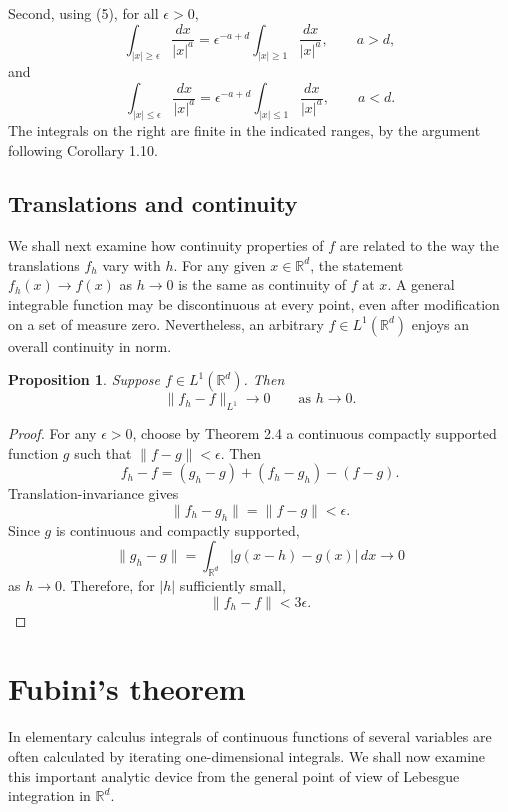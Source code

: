 \documentclass[11pt,openany]{book}
\newtheorem{proposition}[theorem]{Proposition}
\begin{document}
Second, using (5), for all $\epsilon>0$,
\begin{equation}
\int_{|x|\geq\epsilon}\frac{dx}{|x|^a}
=\epsilon^{-a+d}\int_{|x|\geq1}\frac{dx}{|x|^a},
\qquad a>d,
\tag{7}
\end{equation}
and
\begin{equation}
\int_{|x|\leq\epsilon}\frac{dx}{|x|^a}
=\epsilon^{-a+d}\int_{|x|\leq1}\frac{dx}{|x|^a},
\qquad a<d.
\tag{8}
\end{equation}
The integrals on the right are finite in the indicated ranges, by the argument following Corollary 1.10.

\subsection*{Translations and continuity}

We shall next examine how continuity properties of $f$ are related to the way the translations $f_h$ vary with $h$. For any given $x\in\mathbb{R}^d$, the statement $f_h(x)\to f(x)$ as $h\to0$ is the same as continuity of $f$ at $x$. A general integrable function may be discontinuous at every point, even after modification on a set of measure zero. Nevertheless, an arbitrary $f\in L^1(\mathbb{R}^d)$ enjoys an overall continuity in norm.

\begin{proposition}
Suppose $f\in L^1(\mathbb{R}^d)$. Then
\[
\|f_h-f\|_{L^1}\to0\qquad\text{as }h\to0.
\]
\end{proposition}

\begin{proof}
For any $\epsilon>0$, choose by Theorem 2.4 a continuous compactly supported function $g$ such that $\|f-g\|<\epsilon$. Then
\[
f_h-f=(g_h-g)+(f_h-g_h)-(f-g).
\]
Translation-invariance gives
\[
\|f_h-g_h\|=\|f-g\|<\epsilon.
\]
Since $g$ is continuous and compactly supported,
\[
\|g_h-g\|
=\int_{\mathbb{R}^d}|g(x-h)-g(x)|\,dx\to0
\]
as $h\to0$. Therefore, for $|h|$ sufficiently small,
\[
\|f_h-f\|<3\epsilon.
\]
\end{proof}

\section{Fubini's theorem}

In elementary calculus integrals of continuous functions of several variables are often calculated by iterating one-dimensional integrals. We shall now examine this important analytic device from the general point of view of Lebesgue integration in $\mathbb{R}^d$.
\end{document}
